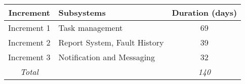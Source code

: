 
\begin{tabular}{c|l|c}
\textbf{Increment} & \textbf{Subsystems} & \textbf{Duration (days)} \\ \hline
Increment 1 & Task management & 69 \\
Increment 2 & Report System, Fault History & 39 \\
Increment 3 & Notification and Messaging & 32 \\ \hline
\textit{Total} &  & \textit{140} \\
\end{tabular}
